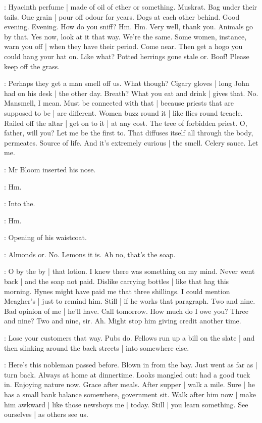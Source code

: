 \BloomAbstract:
Hyacinth perfume |
made of oil of ether or something.
Muskrat.
Bag under their tails.
One grain |
pour off odour for years.
Dogs at each other behind.
Good evening.
Evening.
How do you sniff?
Hm.
Hm.
Very well,
thank you.
Animals go by that.%
Yes now,
look at it that way.
We're the same.
Some women,
instance,
warn you off |
when they have their period.
Come near.
Then get a hogo you could hang your hat on.
Like what?
Potted herrings gone stale or.
Boof!
Please keep off the grass.

\BloomAbstract:
Perhaps they get a man smell off us.
What though?
Cigary gloves |
long John had on his desk |
the other day.
Breath?
What you eat and drink |
gives that.
No.
Mansmell,
I mean.
Must be connected with that |
because priests that are supposed to be |
are different.
Women buzz round it |
like flies round treacle.
Railed off the altar |
get on to it |
at any cost.
The tree of forbidden priest.
O,
father,
will you?
Let me be the first to.
That diffuses itself all through the body,
permeates.%
Source of life.
And it's extremely curious |
the smell.
Celery sauce.
Let me.

:
Mr Bloom inserted his nose.

\BloomInt:
Hm.

:
Into the.

\BloomInt:
Hm.

:
Opening of his waistcoat.

\BloomCurrent:
Almonds or.
No.
Lemons
it is.
Ah no,
that's the soap.

\BloomToday:
O by the by |
that lotion.
I knew there was something on my mind.
Never went back |
and the soap not paid.
Dislike carrying bottles |
like that hag this morning.
Hynes might have paid me that three shillings.
I could mention Meagher's |
just to remind him.
Still |
if he works that paragraph.
Two and nine.
Bad opinion of me |
he'll have.
Call tomorrow.
How much do I owe you?
Three and nine?
Two and nine,
sir.
Ah.
Might stop him giving credit another time.

\BloomAbstract:
Lose your customers that way.%
Pubs do.
Fellows run up a bill on the slate |
and then slinking around the back streets |
into somewhere else.

\BloomCurrent:
Here's this nobleman passed before.
Blown in from the bay.
Just went as far as |
turn back.
Always at home at dinnertime.
Looks mangled out:
had a good tuck in.
Enjoying nature now.
Grace after meals.
After supper |
walk a mile.
Sure |
he has a small bank balance somewhere,
government sit.
Walk after him now |
make him awkward |
like those newsboys me |
today.
Still |
you learn something.
See ourselves |
as others see us.

